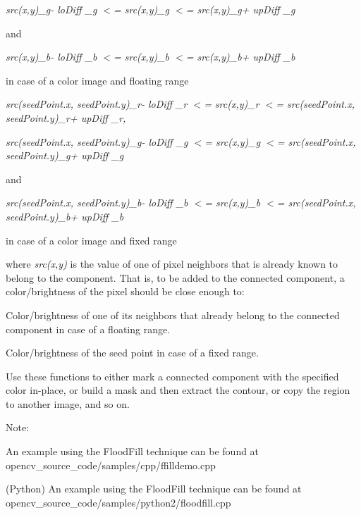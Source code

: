 {\itshape src(x\textquotesingle{},y\textquotesingle{})\+\_\+g-\/ lo\+Diff \+\_\+g $<$= src(x,y)\+\_\+g $<$= src(x\textquotesingle{},y\textquotesingle{})\+\_\+g+ up\+Diff \+\_\+g}

and

{\itshape src(x\textquotesingle{},y\textquotesingle{})\+\_\+b-\/ lo\+Diff \+\_\+b $<$= src(x,y)\+\_\+b $<$= src(x\textquotesingle{},y\textquotesingle{})\+\_\+b+ up\+Diff \+\_\+b}

in case of a color image and floating range


\begin{DoxyItemize}
\item {\itshape src(seed\+Point.\+x, seed\+Point.\+y)\+\_\+r-\/ lo\+Diff \+\_\+r $<$= src(x,y)\+\_\+r $<$= src(seed\+Point.\+x, seed\+Point.\+y)\+\_\+r+ up\+Diff \+\_\+r,}


\end{DoxyItemize}

{\itshape src(seed\+Point.\+x, seed\+Point.\+y)\+\_\+g-\/ lo\+Diff \+\_\+g $<$= src(x,y)\+\_\+g $<$= src(seed\+Point.\+x, seed\+Point.\+y)\+\_\+g+ up\+Diff \+\_\+g}

and

{\itshape src(seed\+Point.\+x, seed\+Point.\+y)\+\_\+b-\/ lo\+Diff \+\_\+b $<$= src(x,y)\+\_\+b $<$= src(seed\+Point.\+x, seed\+Point.\+y)\+\_\+b+ up\+Diff \+\_\+b}

in case of a color image and fixed range

where {\itshape src(x\textquotesingle{},y\textquotesingle{})} is the value of one of pixel neighbors that is already known to belong to the component. That is, to be added to the connected component, a color/brightness of the pixel should be close enough to\+:


\begin{DoxyItemize}
\item Color/brightness of one of its neighbors that already belong to the connected component in case of a floating range. 
\item Color/brightness of the seed point in case of a fixed range. 
\end{DoxyItemize}

Use these functions to either mark a connected component with the specified color in-\/place, or build a mask and then extract the contour, or copy the region to another image, and so on.

Note\+:


\begin{DoxyItemize}
\item An example using the Flood\+Fill technique can be found at opencv\+\_\+source\+\_\+code/samples/cpp/ffilldemo.\+cpp 
\item (Python) An example using the Flood\+Fill technique can be found at opencv\+\_\+source\+\_\+code/samples/python2/floodfill.\+cpp 
\end{DoxyItemize}


